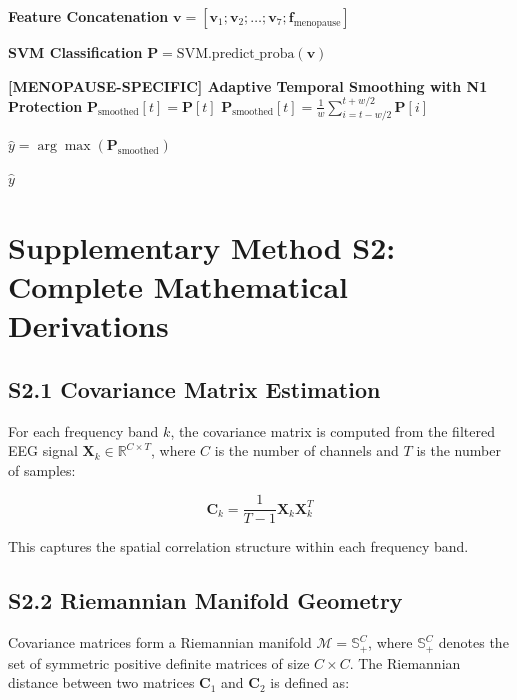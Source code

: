 \documentclass[ASNA,twocolumn]{USG}
\begin{document}
\begin{algorithm}[!ht]
\begin{algorithmic}[1]
\State \textbf{Feature Concatenation}
\State $\mathbf{v} = [\mathbf{v}_1; \mathbf{v}_2; \dots; \mathbf{v}_7; \mathbf{f}_{\text{menopause}}]$

\State \textbf{SVM Classification}
\State $\mathbf{P} = \text{SVM.predict\_proba}(\mathbf{v})$

\State \textbf{[MENOPAUSE-SPECIFIC] Adaptive Temporal Smoothing with N1 Protection}
        \State $\mathbf{P}_{\text{smoothed}}[t] = \mathbf{P}[t]$ 
    \Else
        \State $\mathbf{P}_{\text{smoothed}}[t] = \frac{1}{w} \sum_{i=t-w/2}^{t+w/2} \mathbf{P}[i]$
    \EndIf
\EndFor

\State $\hat{y} = \arg\max(\mathbf{P}_{\text{smoothed}})$

\State \Return $\hat{y}$
\end{algorithmic}
\label{alg:menoscafbts_supp}
\end{algorithm}

\section*{Supplementary Method S2: Complete Mathematical Derivations}

\subsection*{S2.1 Covariance Matrix Estimation}
For each frequency band $k$, the covariance matrix is computed from the filtered EEG signal $\mathbf{X}_k \in \mathbb{R}^{C \times T}$, where $C$ is the number of channels and $T$ is the number of samples:

\[
\mathbf{C}_k = \frac{1}{T-1} \mathbf{X}_k \mathbf{X}_k^T
\]

This captures the spatial correlation structure within each frequency band.

\subsection*{S2.2 Riemannian Manifold Geometry}
Covariance matrices form a Riemannian manifold $\mathcal{M} = \mathbb{S}_+^C$, where $\mathbb{S}_+^C$ denotes the set of symmetric positive definite matrices of size $C \times C$. The Riemannian distance between two matrices $\mathbf{C}_1$ and $\mathbf{C}_2$ is defined as:
\end{document}
